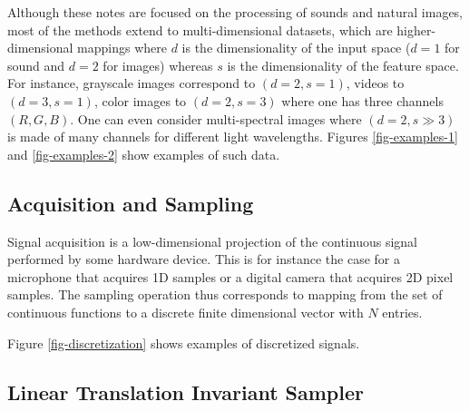 Although these notes are focused on the processing of sounds and natural images, most of the methods extend to multi-dimensional datasets, which are higher-dimensional mappings
where $d$ is the dimensionality of the input space ($d=1$ for sound and $d=2$ for images) whereas $s$ is the dimensionality of the feature space. For instance, grayscale images correspond to $(d=2,s=1)$, 
videos to $(d=3, s=1)$, color images to $(d=2, s=3)$ where one has three channels $(R,G,B)$.
One can even consider multi-spectral images where $(d=2, s \gg 3)$ is made of many channels for different light wavelengths. Figures \ref{fig-examples-1} and \ref{fig-examples-2} show examples of such data.





\subsection{Acquisition and Sampling}

Signal acquisition is a low-dimensional projection of the continuous signal performed by some hardware device. This is for instance the case for a microphone that acquires 1D samples or a digital camera that acquires 2D pixel samples.
The sampling operation thus corresponds to mapping from the set of continuous functions to a discrete finite dimensional vector with $N$ entries.


Figure \ref{fig-discretization} shows examples of discretized signals.

\subsection{Linear Translation Invariant Sampler}

